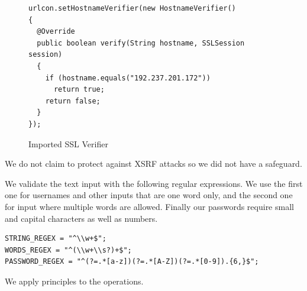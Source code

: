 \documentclass[a4paper]{article}
\begin{document}
\begin{figure}
\caption{Imported SSL Verifier}
\label{fig:ssl_verifier}   
\begin{lstlisting}
urlcon.setHostnameVerifier(new HostnameVerifier()
{
  @Override
  public boolean verify(String hostname, SSLSession session)
  {
    if (hostname.equals("192.237.201.172"))
      return true;
    return false;
  }
});
\end{lstlisting}
\end{figure}







We do not claim to protect against XSRF attacks so we did not have a safeguard.

We validate the text input with the following regular expressions. We use the first one for usernames and other inputs that are one word only, and the second one for input where multiple words are allowed. Finally our passwords require small and capital characters as well as numbers.
\begin{verbatim}
STRING_REGEX = "^\\w+$";
WORDS_REGEX = "^(\\w+\\s?)+$";
PASSWORD_REGEX = "^(?=.*[a-z])(?=.*[A-Z])(?=.*[0-9]).{6,}$";
\end{verbatim}


We apply principles\cite{princ} to the operations.
\end{document}
